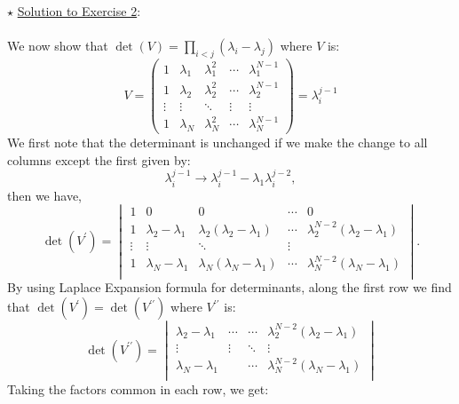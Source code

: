 \documentclass[letter,11pt]{article}
\begin{document}
\noindent $\star$ \ul{Solution to Exercise 2}:
\\ \\ 
We now show that $\det(V) = \prod_{i<j} (\lambda_i - \lambda_j)$ where $V$ is: 
\begin{equation*}
	V = 
	\begin{pmatrix}
		1 & \lambda_1 & \lambda_{1}^{2} & \cdots & \lambda_{1}^{N-1} \\
		1 & \lambda_2 & \lambda_{2}^{2} & \cdots & \lambda_{2}^{N-1} \\ 
		\vdots  & \vdots  & \ddots & \vdots & \vdots \\
		1 & \lambda_N & \lambda_{N}^{2} & \cdots & \lambda_{N}^{N-1} 
	\end{pmatrix} = \lambda_{i}^{j-1} 
\end{equation*}
We first note that the determinant is unchanged
if we make the change to all columns except the first given by:
\begin{equation}
	\lambda_{i}^{j-1} \to \lambda_{i}^{j-1} - \lambda_{1} \lambda_{i}^{j-2},
\end{equation}
then we have, 
\begin{equation}
	\det(V^{\prime}) = 
	\begin{vmatrix}
		1 & 0 & 0 & \cdots & 0 \\
		1 & \lambda_2 - \lambda_1 & \lambda_2(\lambda_2 - \lambda_1) & \cdots & \lambda_2^{N-2}(\lambda_2 - \lambda_1) \\ 
		\vdots  & \vdots  & \ddots & \vdots  \\
		1 & \lambda_N - \lambda_1 & \lambda_N(\lambda_N - \lambda_1) & \cdots & \lambda_N^{N-2}(\lambda_N - \lambda_1) \\
	\end{vmatrix}.
\end{equation}
By using Laplace Expansion formula for determinants, along the first row we find that $\det(V^{\prime}) = \det(V^{\prime\prime})$ where $V^{\prime\prime}$ is:
\begin{equation}
	\det(V^{\prime\prime}) = 
	\begin{vmatrix}
		 \lambda_2 - \lambda_1 & \cdots & \cdots & \lambda_2^{N-2}(\lambda_2 - \lambda_1) \\ 
		\vdots  & \vdots  & \ddots & \vdots  \\
		\lambda_N - \lambda_1 &  & \cdots &  \lambda_N^{N-2}(\lambda_N - \lambda_1) \\
	\end{vmatrix}
\end{equation}
Taking the factors common in each row, we get:
\end{document}
